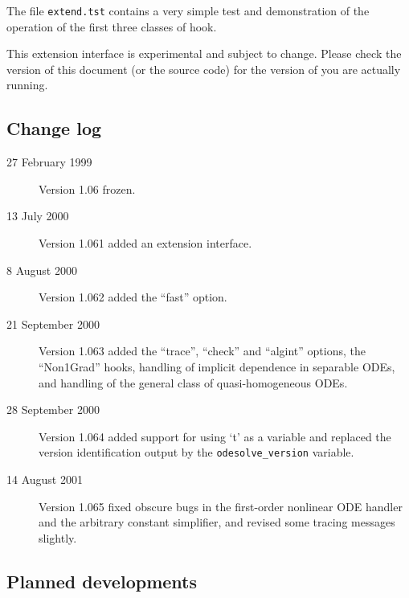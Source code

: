 \noindent\hrulefill
\bigskip

The file \texttt{extend.tst} contains a very simple test and
demonstration of the operation of the first three classes of hook.

This extension interface is experimental and subject to change.
Please check the version of this document (or the source code) for the
version of  you are actually running.


\subsection{Change log}

\begin{description}
\item[27 February 1999] Version 1.06 frozen.
\item[13 July 2000] Version 1.061 added an extension interface.
\item[8 August 2000] Version 1.062 added the ``fast'' option.
\item[21 September 2000] Version 1.063 added the ``trace'', ``check''
  and ``algint'' options, the ``Non1Grad'' hooks, handling of implicit
  dependence in separable ODEs, and handling of the general class of
  quasi-homogeneous ODEs.
\item[28 September 2000] Version 1.064 added support for using `t' as
  a variable and replaced the version identification output by the
  \verb|odesolve_version| variable.
\item[14 August 2001] Version 1.065 fixed obscure bugs in the
  first-order nonlinear ODE handler and the arbitrary constant
  simplifier, and revised some tracing messages slightly.

\end{description}


\subsection{Planned developments}

